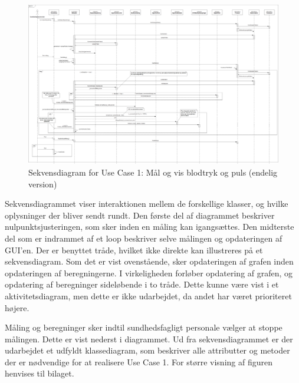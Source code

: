 \clearpage
\vspace{0.5 cm}
\begin{figure}[h!]
	\centering
	\includegraphics[width=1\linewidth]{Arkitektur_og_design/Softwarearkitektur/sekvensdiagram}
	\caption{Sekvensdiagram for Use Case 1: Mål og vis blodtryk og puls (endelig version)}
	\label{fig:sekvensdiagram_ver2}	
\end{figure}
\vspace{0.5 cm}

Sekvensdiagrammet viser interaktionen mellem de forskellige klasser, og hvilke oplysninger der bliver sendt rundt. Den første del af diagrammet beskriver nulpunktsjusteringen, som sker inden en måling kan igangsættes. Den midterste del som er indrammet af et loop beskriver selve målingen og opdateringen af GUI’en.  Der er benyttet tråde, hvilket ikke direkte kan illustreres på et sekvensdiagram. Som det er vist ovenstående, sker opdateringen af grafen inden opdateringen af beregningerne. I virkeligheden forløber opdatering af grafen, og opdatering af beregninger sideløbende i to tråde. Dette kunne være vist i et aktivitetsdiagram, men dette er ikke udarbejdet, da andet har været prioriteret højere. 

Måling og beregninger sker indtil sundhedsfagligt personale vælger at stoppe målingen. Dette er vist nederst i diagrammet. Ud fra sekvensdiagrammet er der udarbejdet et udfyldt klassediagram, som beskriver alle attributter og metoder der er nødvendige for at realisere Use Case 1. For større visning af figuren henvises til bilaget.


